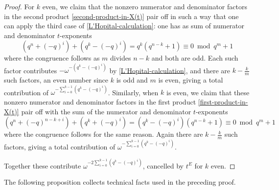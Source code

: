 \documentclass[10pt]{amsart}
\theoremstyle{plain}
\theoremstyle{definition}
\theoremstyle{remark}
\numberwithin{equation}{section}
\begin{document}
\begin{proof}
For $k$ even, we claim that the nonzero numerator and denominator
factors in the second product \eqref{second-product-in-X(t)} pair off 
in such a way that one can apply the third case of \eqref{L'Hopital-calculation}:
one has as sum of numerator and denominator $t$-exponents
$$
\left( q^n+(-q)^i\right) + \left( q^k-(-q)^i\right)
=q^k(q^{n-k}+1) \equiv 0 \bmod{q^m+1}
$$ 
where the congruence follows as $m$ divides $n-k$ and both are odd. 
Each such factor contributes $-\omega^{-(q^k-(-q)^i)}$ by \eqref{L'Hopital-calculation},
and there are $k-\frac{k}{m}$ such factors, an even number
since $k$ is odd and $m$ is even, giving a total contribution of 
$\omega^{-\sum_{i=0}^{k-1} (q^k-(-q)^i)}$.
Similarly, when $k$ is even,  we claim that these nonzero numerator and denominator
factors in the first product \eqref{first-product-in-X(t)} pair off 
with the sum of the numerator and denominator $t$-exponents 
$$
\left( q^n+(-q)^{n-k+i}\right) + (q^k+(-q)^i)=(q^k-(-q)^i)(q^{n-k}+1) \equiv 0 \bmod{q^m+1}
$$
where the congruence follows for the same reason.  Again there are
$k-\frac{k}{m}$ such factors, giving a total contribution of
$\omega^{-\sum_{i=0}^{k-1} (q^k-(-q)^{i})}$. 

Together these contribute $\omega^{-2\sum_{i=0}^{k-1} (q^k-(-q)^{i})}$,
cancelled by $t^E$ for $k$ even.
\end{proof} 

The following proposition collects technical facts used in
the preceding proof.
\end{document}
